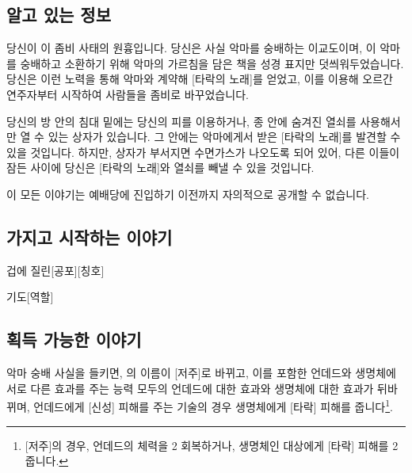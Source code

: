 \documentclass{report}
\begin{document}
	\subsection*{알고 있는 정보}
		당신이 이 좀비 사태의 원흉입니다. 당신은 사실 악마를 숭배하는 이교도이며, 이 악마를 숭배하고 소환하기 위해 악마의 가르침을 담은 책을 성경 표지만 덧씌워두었습니다. 당신은 이런 노력을 통해 악마와 계약해 [타락의 노래]를 얻었고, 이를 이용해 오르간 연주자부터 시작하여 사람들을 좀비로 바꾸었습니다.
		
		당신의 방 안의 침대 밑에는 당신의 피를 이용하거나, 종 안에 숨겨진 열쇠를 사용해서만 열 수 있는 상자가 있습니다. 그 안에는 악마에게서 받은 [타락의 노래]를 발견할 수 있을 것입니다. 하지만, 상자가 부서지면 수면가스가 나오도록 되어 있어, 다른 이들이 잠든 사이에 당신은 [타락의 노래]와 열쇠를 빼낼 수 있을 것입니다.
		
		이 모든 이야기는 예배당에 진입하기 이전까지 자의적으로 공개할 수 없습니다.
	
	\subsection*{가지고 시작하는 이야기}
		\begin{spoiler}{겁에 질린}{[공포][칭호]}
			
			

		\end{spoiler}
		
		\begin{spoiler}{기도}{[역할]}
		\end{spoiler}
	
	\subsection*{획득 가능한 이야기}
	악마 숭배 사실을 들키면, 의 이름이 [저주]로 바뀌고, 이를 포함한 언데드와 생명체에 서로 다른 효과를 주는 능력 모두의 언데드에 대한 효과와 생명체에 대한 효과가 뒤바뀌며, 언데드에게 [신성] 피해를 주는 기술의 경우 생명체에게 [타락] 피해를 줍니다\footnote{[저주]의 경우, 언데드의 체력을 2 회복하거나, 생명체인 대상에게 [타락] 피해를 2 줍니다.}.
	
\end{document}
